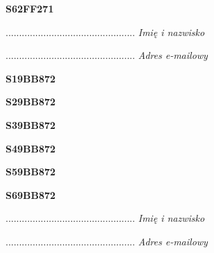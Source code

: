 \begin{turn}{90}\huge \textbf{S62FF271}\end{turn}

\begin{turn}{90}\begin{minipage}{\linewidth} \vspace{20mm} ................................................  \textit{Imię i nazwisko}\end{minipage}\end{turn}

\begin{turn}{90}\begin{minipage}{\linewidth} \vspace{20mm} ................................................  \textit{Adres e-mailowy}\end{minipage}\end{turn}

\begin{turn}{90}\huge \textbf{S19BB872}\end{turn}

\begin{turn}{90}\huge \textbf{S29BB872}\end{turn}

\begin{turn}{90}\huge \textbf{S39BB872}\end{turn}

\begin{turn}{90}\huge \textbf{S49BB872}\end{turn}

\begin{turn}{90}\huge \textbf{S59BB872}\end{turn}

\begin{turn}{90}\huge \textbf{S69BB872}\end{turn}

\begin{turn}{90}\begin{minipage}{\linewidth} \vspace{20mm} ................................................  \textit{Imię i nazwisko}\end{minipage}\end{turn}

\begin{turn}{90}\begin{minipage}{\linewidth} \vspace{20mm} ................................................  \textit{Adres e-mailowy}\end{minipage}\end{turn}

